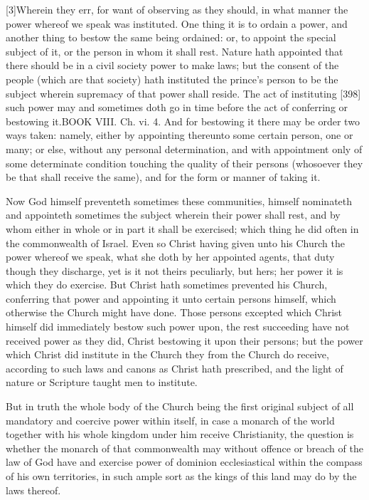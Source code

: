 [3]Wherein they err, for want of observing as they should, in what manner the power whereof we speak was instituted. One thing it is to ordain a power, and another thing to bestow the same being ordained: or, to appoint the special subject of it, or the person in whom it shall rest. Nature hath appointed that there should be in a civil society power to make laws; but the consent of the people (which are that society) hath instituted the prince’s person to be the subject wherein supremacy of that power shall reside. The act of instituting [398] such power may and sometimes doth go in time before the act of conferring or bestowing it.BOOK VIII. Ch. vi. 4. And for bestowing it there may be order two ways taken: namely, either by appointing thereunto some certain person, one or many; or else, without any personal determination, and with appointment only of some determinate condition touching the quality of their persons (whosoever they be that shall receive the same), and for the form or manner of taking it.

Now God himself preventeth sometimes these communities, himself nominateth and appointeth sometimes the subject wherein their power shall rest, and by whom either in whole or in part it shall be exercised; which thing he did often in the commonwealth of Israel. Even so Christ having given unto his Church the power whereof we speak, what she doth by her appointed agents, that duty though they discharge, yet is it not theirs peculiarly, but hers; her power it is which they do exercise. But Christ hath sometimes prevented his Church, conferring that power and appointing it unto certain persons himself, which otherwise the Church might have done. Those persons excepted which Christ himself did immediately bestow such power upon, the rest succeeding have not received power as they did, Christ bestowing it upon their persons; but the power which Christ did institute in the Church they from the Church do receive, according to such laws and canons as Christ hath prescribed, and the light of nature or Scripture taught men to institute.

But in truth the whole body of the Church being the first original subject of all mandatory and coercive power within itself, in case a monarch of the world together with his whole kingdom under him receive Christianity, the question is whether the monarch of that commonwealth may without offence or breach of the law of God have and exercise power of dominion ecclesiastical within the compass of his own territories, in such ample sort as the kings of this land may do by the laws thereof.

